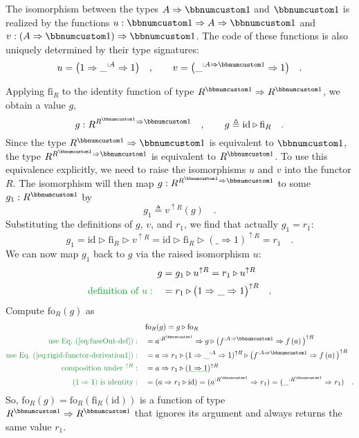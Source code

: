 The isomorphism between the types $A\Rightarrow\bbnum 1$ and $\bbnum 1$
is realized by the functions $u:\bbnum 1\Rightarrow A\Rightarrow\bbnum 1$
and $v:\left(A\Rightarrow\bbnum 1\right)\Rightarrow\bbnum 1$. The
code of these functions is also uniquely determined by their type
signatures:
\[
u=\big(1\Rightarrow\_^{:A}\Rightarrow1\big)\quad,\quad\quad v=\big(\_^{:A\Rightarrow\bbnum 1}\Rightarrow1\big)\quad.
\]

Applying $\text{fi}_{R}$ to the identity function of type $R^{\bbnum 1}\Rightarrow R^{\bbnum 1}$,
we obtain a value $g$, 
\[
g:R^{R^{\bbnum 1}\Rightarrow\bbnum 1}\quad,\quad\quad g\triangleq\text{id}\triangleright\text{fi}_{R}\quad.
\]
Since the type $R^{\bbnum 1}\Rightarrow\bbnum 1$ is equivalent to
$\bbnum 1$, the type $R^{R^{\bbnum 1}\Rightarrow\bbnum 1}$ is equivalent
to $R^{\bbnum 1}$. To use this equivalence explicitly, we need to
raise the isomorphisms $u$ and $v$ into the functor $R$. The isomorphism
will then map $g:R^{R^{\bbnum 1}\Rightarrow\bbnum 1}$ to some $g_{1}:R^{\bbnum 1}$
by
\[
g_{1}\triangleq v^{\uparrow R}(g)\quad.
\]
Substituting the definitions of $g$, $v$, and $r_{1}$, we find
that actually $g_{1}=r_{1}$:
\[
g_{1}=\text{id}\triangleright\text{fi}_{R}\triangleright v^{\uparrow R}=\text{id}\triangleright\text{fi}_{R}\triangleright(\_\Rightarrow1)^{\uparrow R}=r_{1}\quad.
\]
We can now map $g_{1}$ back to $g$ via the raised isomorphism $u$:
\begin{align}
g & =g_{1}\triangleright u^{\uparrow R}=r_{1}\triangleright u^{\uparrow R}\nonumber \\
{\color{greenunder}\text{definition of }u:}\quad & =r_{1}\triangleright\big(1\Rightarrow\_\Rightarrow1\big)^{\uparrow R}\quad.\label{eq:rigid-functor-derivation1}
\end{align}
Compute $\text{fo}_{R}(g)$ as
\begin{align*}
 & \text{fo}_{R}(g)=g\triangleright\text{fo}_{R}\\
{\color{greenunder}\text{use Eq.~(\ref{eq:fuseOut-def})}:}\quad & =a^{:R^{\bbnum 1}}\Rightarrow g\triangleright\big(f^{:A\Rightarrow\bbnum 1}\Rightarrow f\left(a\right)\big)^{\uparrow R}\\
{\color{greenunder}\text{use Eq.~(\ref{eq:rigid-functor-derivation1})}:}\quad & =a\Rightarrow r_{1}\triangleright(1\Rightarrow\_^{:A}\Rightarrow1)^{\uparrow R}\triangleright\big(f^{:A\Rightarrow\bbnum 1}\Rightarrow f\left(a\right)\big)^{\uparrow R}\\
{\color{greenunder}\text{composition under }^{\uparrow R}:}\quad & =a\Rightarrow r_{1}\triangleright(\gunderline{1\Rightarrow1})^{\uparrow R}\\
{\color{greenunder}(1\Rightarrow1)\text{ is identity}:}\quad & =(a\Rightarrow r_{1}\triangleright\text{id})=(a^{:R^{\bbnum 1}}\Rightarrow r_{1})=(\_^{:R^{\bbnum 1}}\Rightarrow r_{1})\quad.
\end{align*}
So, $\text{fo}_{R}(g)=\text{fo}_{R}(\text{fi}_{R}(\text{id}))$ is
a function of type $R^{\bbnum 1}\Rightarrow R^{\bbnum 1}$ that ignores
its argument and always returns the same value $r_{1}$.


